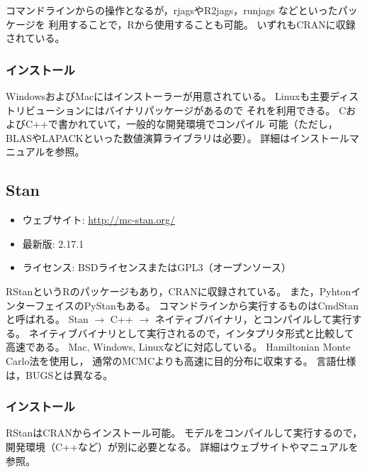 \documentclass[11pt,uplatex]{jsarticle}
\begin{document}
コマンドラインからの操作となるが，\textsf{rjags}や\textsf{R2jags}，\textsf{runjags}
などといったパッケージを
利用することで，\textsf{R}から使用することも可能。
いずれもCRANに収録されている。

\subsubsection*{インストール}
WindowsおよびMacにはインストーラーが用意されている。
Linuxも主要ディストリビューションにはバイナリパッケージがあるので
それを利用できる。
CおよびC++で書かれていて，一般的な開発環境でコンパイル
可能（ただし，BLASやLAPACKといった数値演算ライブラリは必要）。
詳細はインストールマニュアルを参照。

\subsection{Stan}
\label{Stan}
\begin{itemize}
\item ウェブサイト: \url{http://mc-stan.org/}
\item 最新版: 2.17.1
\item ライセンス: BSDライセンスまたはGPL3（オープンソース）
\end{itemize}

\textsf{RStan}という\textsf{R}のパッケージもあり，CRANに収録されている。
また，Pyhtonインターフェイスの\textsf{PyStan}もある。
コマンドラインから実行するものは\textsf{CmdStan}と呼ばれる。
Stan $\rightarrow$ C++ $\rightarrow$ ネイティブバイナリ，とコンパイルして実行する。
ネイティブバイナリとして実行されるので，インタプリタ形式と比較して高速である。
Mac, Windows, Linuxなどに対応している。
Hamiltonian Monte Carlo法\cite{PRML, BDA3, Toyoda2015}を使用し，
通常のMCMCよりも高速に目的分布に収束する。
言語仕様は，BUGSとは異なる。

\subsubsection*{インストール}
RStanはCRANからインストール可能。
モデルをコンパイルして実行するので，開発環境（C++など）が別に必要となる。
詳細はウェブサイトやマニュアルを参照。
\end{document}
